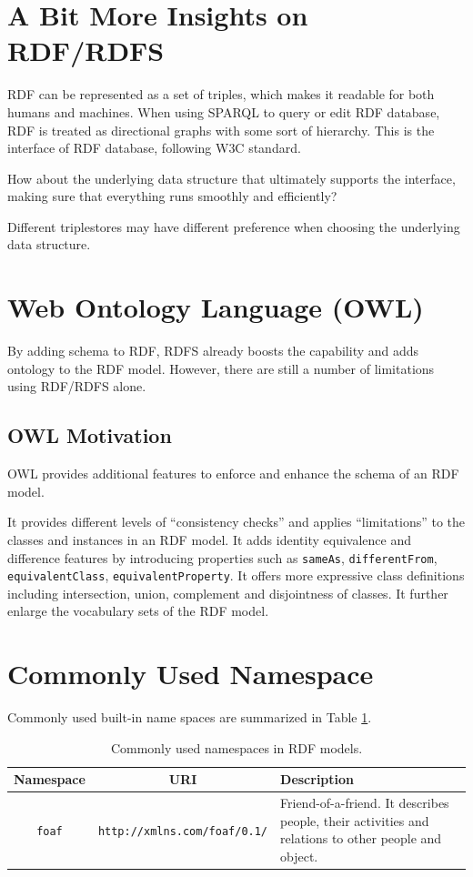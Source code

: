 \section{A Bit More Insights on RDF/RDFS}

RDF can be represented as a set of triples, which makes it readable for both humans and machines. When using SPARQL to query or edit RDF database, RDF is treated as directional graphs with some sort of hierarchy. This is the interface of RDF database, following W3C standard.

How about the underlying data structure that ultimately supports the interface, making sure that everything runs smoothly and efficiently?

Different triplestores may have different preference when choosing the underlying data structure.

\section{Web Ontology Language (OWL)}

By adding schema to RDF, RDFS already boosts the capability and adds ontology to the RDF model. However, there are still a number of limitations using RDF/RDFS alone.

\subsection{OWL Motivation}

OWL provides additional features to enforce and enhance the schema of an RDF model. 

It provides different levels of  ``consistency checks'' and applies ``limitations'' to the classes and instances in an RDF model. It adds identity equivalence and difference features by introducing properties such as \verb|sameAs|, \verb|differentFrom|, \verb|equivalentClass|, \verb|equivalentProperty|. It offers more expressive class definitions including intersection, union, complement and disjointness of classes. It further enlarge the vocabulary sets of the RDF model.

\section{Commonly Used Namespace}

Commonly used built-in name spaces are summarized in Table \ref{tab:commonnamespace}.

\begin{table}
	\centering \caption{Commonly used namespaces in RDF models.} \label{tab:commonnamespace}
	\begin{tabularx}{\textwidth}{|c|c|X|}
		\hline
		Namespace & URI & Description \\ \hline
		\verb|foaf| & \verb|http://xmlns.com/foaf/0.1/| & Friend-of-a-friend. It describes people, their activities and relations to other people and object. \\
		\hline
	\end{tabularx}
\end{table}




